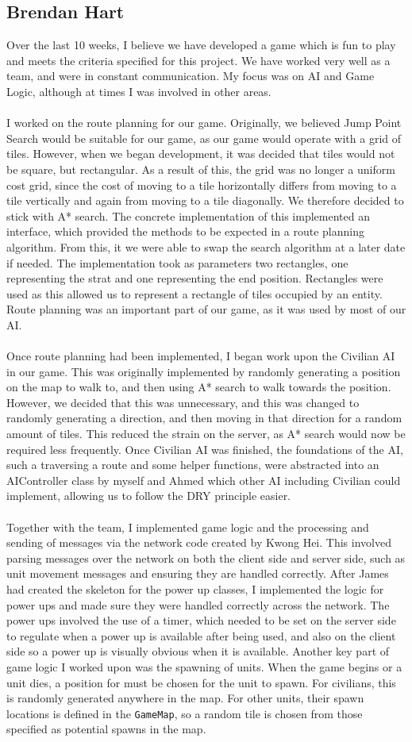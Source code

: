 \documentclass[12pt]{article}
\newcommand{\return}{\\\\\noindent}
\begin{document}
\subsection{Brendan Hart} 
Over the last 10 weeks, I believe we have developed a game which is fun to play and meets the criteria specified for this project. We have worked very well as a team, and were in constant communication. My focus was on AI and Game Logic, although at times I was involved in other areas.\return
I worked on the route planning for our game. Originally, we believed Jump Point Search would be suitable for our game, as our game would operate with a grid of tiles. However, when we began development, it was decided that tiles would not be square, but rectangular. As a result of this, the grid was no longer a uniform cost grid, since the cost of moving to a tile horizontally differs from moving to a tile vertically and again from moving to a tile diagonally. We therefore decided to stick with A* search. The concrete implementation of this implemented an interface, which provided the methods to be expected in a route planning algorithm. From this, it we were able to swap the search algorithm at a later date if needed. The implementation took as parameters two rectangles, one representing the strat and one representing the end position. Rectangles were used as this allowed us to represent a rectangle of tiles occupied by an entity. Route planning was an important part of our game, as it was used by most of our AI.\return
Once route planning had been implemented, I began work upon the Civilian AI in our game. This was originally implemented by randomly generating a position on the map to walk to, and then using A* search to walk towards the position. However, we decided that this was unnecessary, and this was changed to randomly generating a direction, and then moving in that direction for a random amount of tiles. This reduced the strain on the server, as A* search would now be required less frequently. Once Civilian AI was finished, the foundations of the AI, such a traversing a route and some helper functions, were abstracted into an AIController class by myself and Ahmed which other AI including Civilian could implement, allowing us to follow the DRY principle easier.\return
Together with the team, I implemented game logic and the processing and sending of messages via the network code created by Kwong Hei. This involved parsing messages over the network on both the client side and server side, such as unit movement messages and ensuring they are handled correctly. After James had created the skeleton for the power up classes, I implemented the logic for power ups and made sure they were handled correctly across the network. The power ups involved the use of a timer, which needed to be set on the server side to regulate when a power up is available after being used, and also on the client side so a power up is visually obvious when it is available. Another key part of game logic I worked upon was the spawning of units. When the game begins or a unit dies, a position for must be chosen for the unit to spawn. For civilians, this is randomly generated anywhere in the map. For other units, their spawn locations is defined in the \texttt{GameMap}, so a random tile is chosen from those specified as potential spawns in the map.\return
\end{document}
